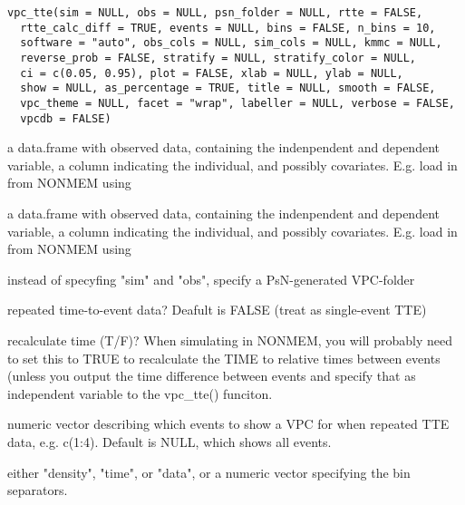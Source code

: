\documentclass[letterpaper]{book}
\begin{document}
%
\begin{Usage}
\begin{verbatim}
vpc_tte(sim = NULL, obs = NULL, psn_folder = NULL, rtte = FALSE,
  rtte_calc_diff = TRUE, events = NULL, bins = FALSE, n_bins = 10,
  software = "auto", obs_cols = NULL, sim_cols = NULL, kmmc = NULL,
  reverse_prob = FALSE, stratify = NULL, stratify_color = NULL,
  ci = c(0.05, 0.95), plot = FALSE, xlab = NULL, ylab = NULL,
  show = NULL, as_percentage = TRUE, title = NULL, smooth = FALSE,
  vpc_theme = NULL, facet = "wrap", labeller = NULL, verbose = FALSE,
  vpcdb = FALSE)
\end{verbatim}
\end{Usage}
%
\begin{Arguments}
\begin{ldescription}
\item[\code{sim}] a data.frame with observed data, containing the indenpendent and dependent variable, a column indicating the individual, and possibly covariates. E.g. load in from NONMEM using 

\item[\code{obs}] a data.frame with observed data, containing the indenpendent and dependent variable, a column indicating the individual, and possibly covariates. E.g. load in from NONMEM using 

\item[\code{psn\_folder}] instead of specyfing "sim" and "obs", specify a PsN-generated VPC-folder

\item[\code{rtte}] repeated time-to-event data? Deafult is FALSE (treat as single-event TTE)

\item[\code{rtte\_calc\_diff}] recalculate time (T/F)? When simulating in NONMEM, you will probably need to set this to TRUE to recalculate the TIME to relative times between events (unless you output the time difference between events and specify that as independent variable to the vpc\_tte() funciton.

\item[\code{events}] numeric vector describing which events to show a VPC for when repeated TTE data, e.g. c(1:4). Default is NULL, which shows all events.

\item[\code{bins}] either "density", "time", or "data", or a numeric vector specifying the bin separators.


\end{ldescription}
\end{Arguments}
\end{document}
